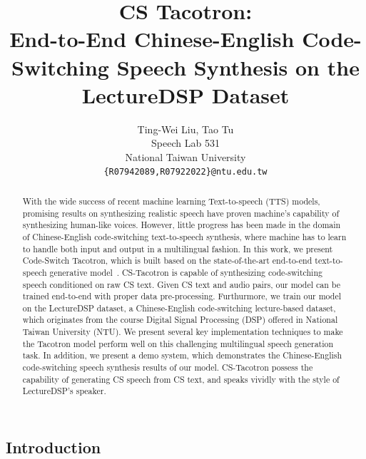 \documentclass{article} %
\title{CS Tacotron: \\ End-to-End Chinese-English Code-Switching Speech Synthesis on the LectureDSP Dataset}
\author{Ting-Wei Liu, Tao Tu \\
Speech Lab 531\\
National Taiwan University\\
\texttt{\{R07942089,R07922022\}@ntu.edu.tw} \\
}
\begin{document}
\begin{CJK}{UTF8}{bsmi}


\maketitle
\begin{abstract}
With the wide success of recent machine learning Text-to-speech (TTS)  models, promising results on synthesizing realistic speech have proven machine's capability of synthesizing human-like voices. However, little progress has been made in the domain of Chinese-English code-switching text-to-speech synthesis, where machine has to learn to handle both input and output in a multilingual fashion. In this work, we present Code-Switch Tacotron, which is built based on the state-of-the-art end-to-end  text-to-speech generative model~\citep{Wang2017}. CS-Tacotron is capable of synthesizing code-switching speech conditioned on raw CS text. Given CS text and audio pairs, our model can be trained end-to-end  with proper data pre-processing. Furthurmore, we train our model on the LectureDSP dataset, a Chinese-English code-switching lecture-based dataset, which originates from the course Digital Signal Processing (DSP) offered in National Taiwan University (NTU). We present several key implementation techniques to make the Tacotron model perform well on this challenging multilingual speech generation task. In addition, we present a demo system, which demonstrates the  Chinese-English code-switching speech synthesis results of our model. CS-Tacotron possess the capability of  generating CS speech from CS text, and speaks vividly with the style of LectureDSP's speaker.
\end{abstract}

\section{Introduction}


\end{CJK}
\end{document}
